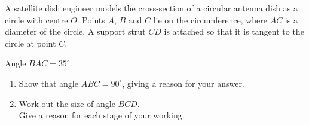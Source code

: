 \begin{question}
\noindent A satellite dish engineer models the cross-section of a circular antenna dish as a circle with centre $O$. Points $A$, $B$ and $C$ lie on the circumference, where $AC$ is a diameter of the circle. A support strut $CD$ is attached so that it is tangent to the circle at point $C$.

\begin{center}
\end{center}

\noindent Angle $BAC = 35^\circ$.

\begin{enumerate}
    \item[(a)] Show that angle $ABC = 90^\circ$, giving a reason for your answer.

    \vspace{3cm}

    \item[(b)] Work out the size of angle $BCD$.\\
    Give a reason for each stage of your working.

    \vspace{4cm}
\end{enumerate}
\end{question}